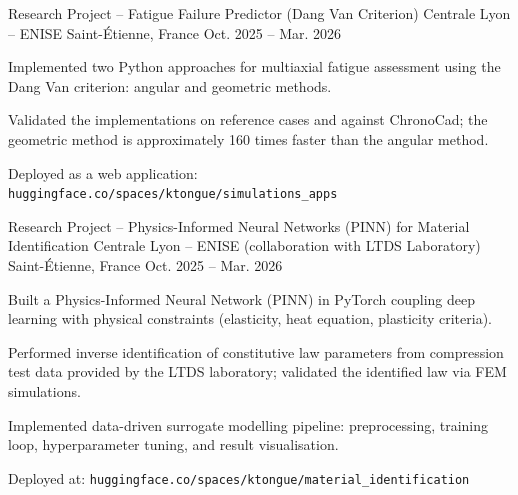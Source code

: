 \documentclass[11pt, a4paper]{awesome-cv}
\begin{document}
\begin{cventries}
  \cventry
    {Research Project – Fatigue Failure Predictor (Dang Van Criterion)}
    {Centrale Lyon -- ENISE}
    {Saint-\'Etienne, France}
    {Oct. 2025 -- Mar. 2026}
    {
      \begin{cvitems}
        \item Implemented two Python approaches for multiaxial fatigue assessment using the Dang Van criterion: angular and geometric methods.
        \item Validated the implementations on reference cases and against ChronoCad; the geometric method is approximately 160 times faster than the angular method.
        \item Deployed as a web application: \texttt{huggingface.co/spaces/ktongue/simulations\_apps}
      \end{cvitems}
    }

  \cventry
    {Research Project – Physics-Informed Neural Networks (PINN) for Material Identification}
    {Centrale Lyon -- ENISE (collaboration with LTDS Laboratory)}
    {Saint-Étienne, France}
    {Oct. 2025 -- Mar. 2026}
    {
      \begin{cvitems}
        \item Built a Physics-Informed Neural Network (PINN) in PyTorch coupling deep learning with physical constraints (elasticity, heat equation, plasticity criteria).
        \item Performed inverse identification of constitutive law parameters from compression test data provided by the LTDS laboratory; validated the identified law via FEM simulations.
        \item Implemented data-driven surrogate modelling pipeline: preprocessing, training loop, hyperparameter tuning, and result visualisation.
        \item Deployed at: \texttt{huggingface.co/spaces/ktongue/material\_identification}
      \end{cvitems}
    }


\end{cventries}
\end{document}
